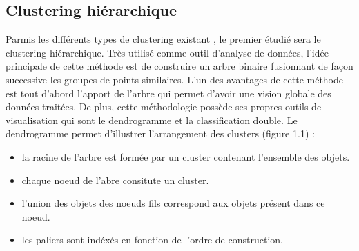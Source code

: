 \documentclass[memoire.tex]{subfiles}
\begin{document}
		\subsection{Clustering hiérarchique}
Parmis les différents types de clustering existant \cite{ref4}, le premier étudié sera le clustering hiérarchique. Très utilisé comme outil d'analyse de données, l'idée principale de cette méthode est de construire un arbre binaire fusionnant de façon successive les groupes de points similaires. L'un des avantages de cette méthode est tout d'abord l'apport de l'arbre qui permet d'avoir une vision globale des données traitées. De plus, cette méthodologie possède ses propres outils de visualisation qui sont le dendrogramme et la classification double. Le dendrogramme permet d'illustrer l'arrangement des clusters (figure 1.1)\cite{ref8} :
\begin{itemize}
\item la racine de l'arbre est formée par un cluster contenant l'ensemble des objets.
\item chaque noeud de l'abre consitute un cluster.
\item l'union des objets des noeuds fils correspond aux objets présent dans ce noeud.
\item les paliers sont indéxés en fonction de l'ordre de construction.
\end{itemize}
\end{document}
